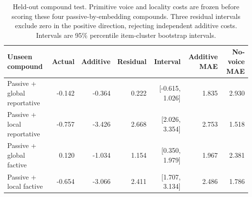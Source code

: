 \begin{table}[H]
\centering
\footnotesize
\setlength{\tabcolsep}{3pt}
\begin{tabularx}{\columnwidth}{Xrrrrrr}
\toprule
Unseen compound & Actual & Additive & Residual & Interval & Additive MAE & No-voice MAE \\
\midrule
Passive + global reportative & -0.142 & -0.364 & 0.222 & [-0.615, 1.026] & 1.835 & 2.930 \\
Passive + local reportative & -0.757 & -3.426 & 2.668 & [2.026, 3.354] & 2.753 & 1.518 \\
Passive + global factive & 0.120 & -1.034 & 1.154 & [0.350, 1.979] & 1.967 & 2.381 \\
Passive + local factive & -0.654 & -3.066 & 2.411 & [1.707, 3.134] & 2.486 & 1.786 \\
\bottomrule
\end{tabularx}
\caption{Held-out compound test. Primitive voice and locality costs are frozen before scoring these four passive-by-embedding compounds. Three residual intervals exclude zero in the positive direction, rejecting independent additive costs. Intervals are 95\% percentile item-cluster bootstrap intervals.}
\label{tab:main-heldout}
\end{table}
